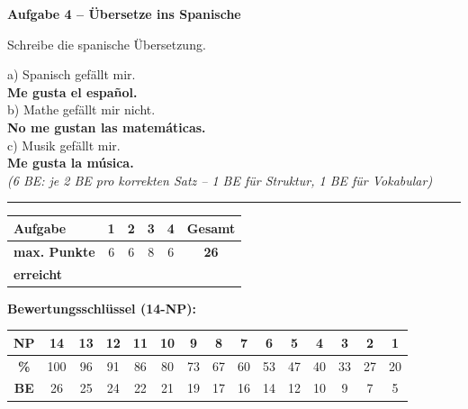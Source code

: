 \documentclass[11pt, a4paper]{article}
\newcommand{\fachfarbe}{spanisch}
\newcommand{\punktebox}[1]{\hfill\fbox{\small \_\_\_/#1}}
\newcommand{\lsg}[1]{\textcolor{loesung}{\textbf{#1}}}
\newenvironment{aufgabe}[1]{%
    \vspace{12pt}
    \noindent\textbf{\textcolor{\fachfarbe}{Aufgabe #1}}
    \vspace{6pt}
    \begin{list}{}{\leftmargin=0pt}
    \item[]
}{%
    \end{list}
}
\begin{document}
\vspace{15pt}


\begin{aufgabe}{4 -- Übersetze ins Spanische}
Schreibe die spanische Übersetzung. \punktebox{6}
\end{aufgabe}

\noindent
a) Spanisch gefällt mir. \\[0.5em]
\lsg{Me gusta el español.} \\[1em]

\noindent
b) Mathe gefällt mir nicht. \\[0.5em]
\lsg{No me gustan las matemáticas.} \\[1em]

\noindent
c) Musik gefällt mir. \\[0.5em]
\lsg{Me gusta la música.} \\

\textcolor{loesung}{\textit{(6 BE: je 2 BE pro korrekten Satz -- 1 BE für Struktur, 1 BE für Vokabular)}}


\vspace{20pt}
\hrule
\vspace{10pt}

\noindent
\begin{tabularx}{\textwidth}{|X|c|c|c|c||c|}
\hline
\textbf{Aufgabe} & 1 & 2 & 3 & 4 & \textbf{Gesamt} \\
\hline
\textbf{max. Punkte} & 6 & 6 & 8 & 6 & \textbf{26} \\
\hline
\textbf{erreicht} & & & & & \\[0.8em]
\hline
\end{tabularx}

\vspace{15pt}

\noindent\textbf{Bewertungsschlüssel (14-NP):}

\begin{center}
\begin{tabular}{|c|c|c|c|c|c|c|c|c|c|c|c|c|c|c|}
\hline
\textbf{NP} & 14 & 13 & 12 & 11 & 10 & 9 & 8 & 7 & 6 & 5 & 4 & 3 & 2 & 1 \\
\hline
\textbf{\%} & 100 & 96 & 91 & 86 & 80 & 73 & 67 & 60 & 53 & 47 & 40 & 33 & 27 & 20 \\
\hline
\textbf{BE} & 26 & 25 & 24 & 22 & 21 & 19 & 17 & 16 & 14 & 12 & 10 & 9 & 7 & 5 \\
\hline
\end{tabular}
\end{center}
\end{document}
